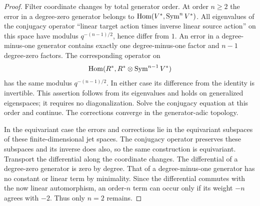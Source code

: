 \begin{proof}
Filter coordinate changes by total generator order. At order $n\geq2$
the error in a degree-zero generator belongs to
$\operatorname{Hom}(V^*,\operatorname{Sym}^nV^*)$. All eigenvalues of the conjugacy operator
``linear target action times inverse linear source action'' on this
space have modulus $q^{-(n-1)/2}$, hence differ from $1$. An error in
a degree-minus-one generator contains exactly one degree-minus-one
factor and $n-1$ degree-zero factors. The corresponding operator on
\[
 \operatorname{Hom}(R^*,R^*\otimes\operatorname{Sym}^{n-1}V^*)
\]
has the same modulus $q^{-(n-1)/2}$. In either case its difference
from the identity is invertible. This assertion follows from its
eigenvalues and holds on generalized eigenspaces; it requires no
diagonalization. Solve the conjugacy equation at this order and
continue. The corrections converge in the generator-adic topology.

In the equivariant case the errors and corrections lie in the
equivariant subspaces of these finite-dimensional jet spaces. The
conjugacy operator preserves these subspaces and its inverse does
also, so the same construction is equivariant. Transport the
differential along the coordinate changes. The differential of a
degree-zero generator is zero by degree. That of a degree-minus-one
generator has no constant or linear term by minimality. Since the
differential commutes with the now linear automorphism, an order-$n$
term can occur only if its weight $-n$ agrees with $-2$. Thus only
$n=2$ remains.
\end{proof}

